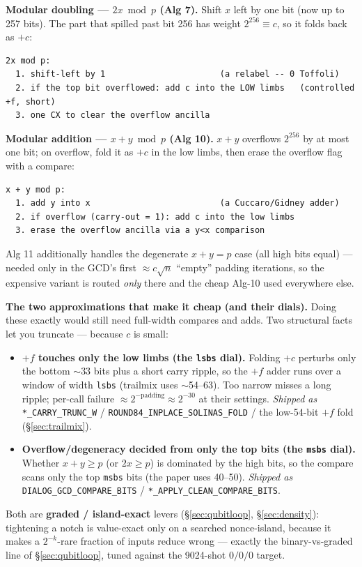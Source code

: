 \documentclass[11pt,a4paper]{article}
\begin{document}
\textbf{Modular doubling --- $2x \bmod p$ (Alg 7).} Shift $x$ left by one bit (now up to 257 bits).
The part that spilled past bit 256 has weight $2^{256} \equiv c$, so it folds back as $+c$:
\begin{lstlisting}
2x mod p:
  1. shift-left by 1                       (a relabel -- 0 Toffoli)
  2. if the top bit overflowed: add c into the LOW limbs   (controlled +f, short)
  3. one CX to clear the overflow ancilla
\end{lstlisting}

\textbf{Modular addition --- $x + y \bmod p$ (Alg 10).} $x + y$ overflows $2^{256}$ by at most one
bit; on overflow, fold it as $+c$ in the low limbs, then erase the overflow flag with a compare:
\begin{lstlisting}
x + y mod p:
  1. add y into x                          (a Cuccaro/Gidney adder)
  2. if overflow (carry-out = 1): add c into the low limbs
  3. erase the overflow ancilla via a y<x comparison
\end{lstlisting}
Alg 11 additionally handles the degenerate $x + y = p$ case (all high bits equal) --- needed only in
the GCD's first $\approx c\sqrt{n}$ ``empty'' padding iterations, so the expensive variant is routed
\emph{only} there and the cheap Alg-10 used everywhere else.

\textbf{The two approximations that make it cheap (and their dials).} Doing these exactly would still
need full-width compares and adds. Two structural facts let you truncate --- because $c$ is small:
\begin{itemize}
  \item \textbf{$+f$ touches only the low limbs (the \texttt{lsbs} dial).} Folding $+c$ perturbs only
    the bottom $\sim$33 bits plus a short carry ripple, so the $+f$ adder runs over a window of width
    \texttt{lsbs} (trailmix uses $\sim$54--63). Too narrow misses a long ripple; per-call failure
    $\approx 2^{-\text{padding}} \approx 2^{-30}$ at their settings. \emph{Shipped as}
    \texttt{*\_CARRY\_TRUNC\_W} / \texttt{ROUND84\_INPLACE\_SOLINAS\_FOLD} / the low-54-bit $+f$ fold
    (\S\ref{sec:trailmix}).
  \item \textbf{Overflow/degeneracy decided from only the top bits (the \texttt{msbs} dial).} Whether
    $x+y \ge p$ (or $2x \ge p$) is dominated by the high bits, so the compare scans only the top
    \texttt{msbs} bits (the paper uses 40--50). \emph{Shipped as} \texttt{DIALOG\_GCD\_COMPARE\_BITS}
    / \texttt{*\_APPLY\_CLEAN\_COMPARE\_BITS}.
\end{itemize}
Both are \textbf{graded / island-exact} levers (\S\ref{sec:qubitloop}, \S\ref{sec:density}):
tightening a notch is value-exact only on a searched nonce-island, because it makes a $2^{-k}$-rare
fraction of inputs reduce wrong --- exactly the binary-vs-graded line of \S\ref{sec:qubitloop}, tuned
against the 9024-shot $0/0/0$ target.
\end{document}
